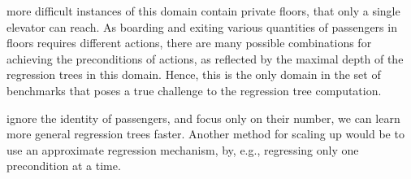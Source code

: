 \documentclass[letterpaper]{article}
\theoremstyle{definition}
\begin{document}
\begin{table}[t!]
\centering
\footnotesize
{}
\caption{Projection computation metrics over a large problem from each domain.}
\label{tbl:projection}
\end{table}


more difficult instances of this domain contain private floors, that only a single elevator can reach. As boarding and exiting various quantities of passengers in floors requires different actions,  there are many possible combinations for achieving the preconditions of actions, as reflected by the maximal depth of the regression trees in this domain. Hence, this is the only domain in the set of benchmarks that poses a true challenge to the regression tree computation.

ignore the identity of passengers, and focus only on their number, we can learn more general regression trees faster. Another method for scaling up would be to use an approximate regression mechanism, by, e.g., regressing only one precondition at a time.
\end{document}

